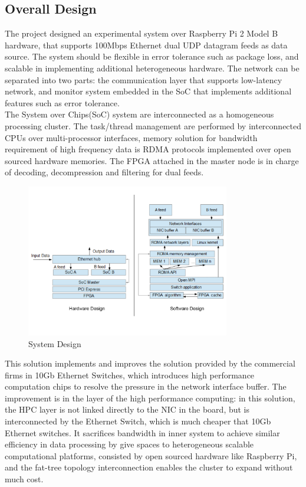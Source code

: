 \documentclass[11pt,openright,a4paper]{report}
\begin{document}
\subsection{Overall Design}
The project designed an experimental system over Raspberry Pi 2 Model B hardware, that supports 100Mbps Ethernet dual UDP datagram feeds as data source. The system should be flexible in error tolerance such as package loss, and scalable in implementing additional heterogeneous hardware. The network can be separated into two parts: the communication layer that supports low-latency network, and monitor system embedded in the SoC that implements additional features such as error tolerance. \\ 
The System over Chips(SoC) system are interconnected as a homogeneous processing cluster. The task/thread management are performed by interconnected CPUs over multi-processor interfaces, memory solution for bandwidth requirement of high frequency data is RDMA protocols implemented over open sourced hardware memories. The FPGA attached in the master node is in charge of decoding, decompression and filtering for dual feeds.\\
\begin{figure}[H]
	\centering\includegraphics[width=3.5in]{picture/System_Design.jpg}
	\caption{System Design}
	\label{fig:system_design}
\end{figure}
This solution implements and improves the solution provided by the commercial firms in 10Gb Ethernet Switches, which introduces high performance computation chips to resolve the pressure in the network interface buffer. The improvement is in the layer of the high performance computing: in this solution, the HPC layer is not linked directly to the NIC in the board, but is interconnected by the Ethernet Switch, which is much cheaper that 10Gb Ethernet switches. It sacrifices bandwidth in inner system to achieve similar efficiency in data processing by give spaces to heterogeneous scalable computational platforms, consisted by open sourced hardware like Raspberry Pi, and the fat-tree topology interconnection enables the cluster to expand without much cost.\\
\end{document}
